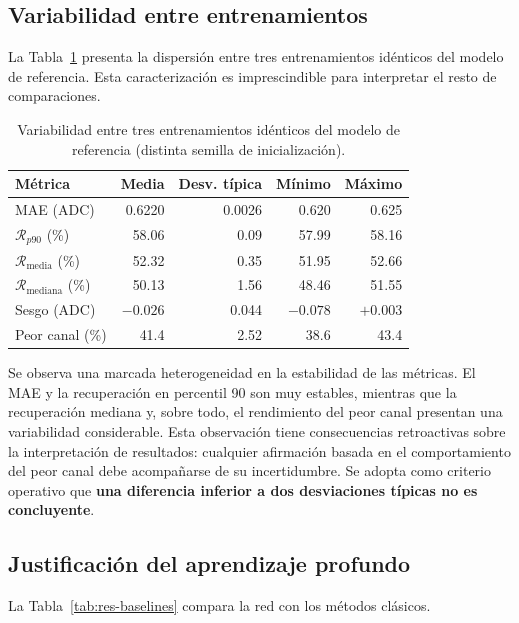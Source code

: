 \subsection{Variabilidad entre entrenamientos}
\label{subsec:res-replicas}

La Tabla~\ref{tab:res-replicas} presenta la dispersión entre tres entrenamientos idénticos del
modelo de referencia. Esta caracterización es imprescindible para interpretar el resto de
comparaciones.

\begin{table}[htbp]
\centering
\caption{Variabilidad entre tres entrenamientos idénticos del modelo de referencia (distinta
semilla de inicialización).}
\label{tab:res-replicas}
\begin{tabular}{lrrrr}
\toprule
\textbf{Métrica} & \textbf{Media} & \textbf{Desv. típica} & \textbf{Mínimo} & \textbf{Máximo} \\
\midrule
MAE (ADC) & 0.6220 & 0.0026 & 0.620 & 0.625 \\
$\mathcal{R}_{p90}$ (\%) & 58.06 & 0.09 & 57.99 & 58.16 \\
$\mathcal{R}_{\text{media}}$ (\%) & 52.32 & 0.35 & 51.95 & 52.66 \\
$\mathcal{R}_{\text{mediana}}$ (\%) & 50.13 & 1.56 & 48.46 & 51.55 \\
Sesgo (ADC) & $-0.026$ & 0.044 & $-0.078$ & $+0.003$ \\
Peor canal (\%) & 41.4 & 2.52 & 38.6 & 43.4 \\
\bottomrule
\end{tabular}
\end{table}

Se observa una marcada heterogeneidad en la estabilidad de las métricas. El MAE y la recuperación en
percentil 90 son muy estables, mientras que la recuperación mediana y, sobre todo, el rendimiento
del peor canal presentan una variabilidad considerable. Esta observación tiene consecuencias
retroactivas sobre la interpretación de resultados: cualquier afirmación basada en el
comportamiento del peor canal debe acompañarse de su incertidumbre. Se adopta como criterio operativo
que \textbf{una diferencia inferior a dos desviaciones típicas no es concluyente}.

\subsection{Justificación del aprendizaje profundo}
\label{subsec:res-baselines}

La Tabla~\ref{tab:res-baselines} compara la red con los métodos clásicos.

